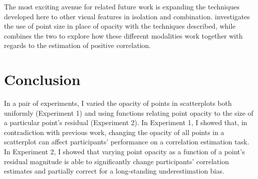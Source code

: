 \documentclass[../main.tex]{subfiles}
\begin{document}
The most exciting avenue for related future work is expanding the
techniques developed here to other visual features in isolation and
combination.  investigates the use of point
size in place of opacity with the techniques described, while
 combines the two to explore how
these different modalities work together with regards to the estimation
of positive correlation.

\section{Conclusion}\label{conclusion-chap4}

In a pair of experiments, I varied the opacity of points in scatterplots
both uniformly (Experiment 1) and using functions relating point opacity
to the size of a particular point's residual (Experiment 2). In
Experiment 1, I showed that, in contradiction with previous work,
changing the opacity of all points in a scatterplot can affect
participants' performance on a correlation estimation task. In
Experiment 2, I showed that varying point opacity as a function of a
point's residual magnitude is able to significantly change participants'
correlation estimates and partially correct for a long-standing
underestimation bias.
\end{document}
